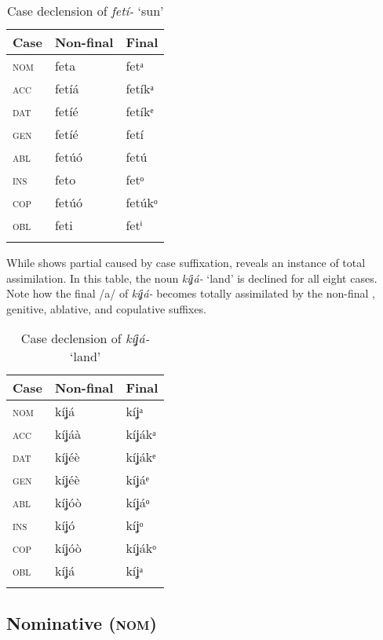 \begin{table}
\caption{Case declension of \textit{fetí-} ‘sun’}
\label{tab:case:feti}
\begin{tabularx}{.66\textwidth}{XXX}
\lsptoprule
Case & Non-final & Final\\
\midrule
\textsc{nom} & feta & fetᵃ\\
\textsc{acc} & fetíá & fetíkᵃ\\
\textsc{dat} & fetíé & fetíkᵉ\\
\textsc{gen} & fetíé & fetí\\
\textsc{abl} & fetúó & fetú\\
\textsc{ins} & feto & fetᵒ\\
\textsc{cop} & fetúó & fetúkᵒ\\
\textsc{obl} & feti & fetⁱ\\
\lspbottomrule
\end{tabularx}
\end{table}
While  shows partial  caused by case suffixation,  reveals an instance of total assimilation. In this table, the noun \textit{kíʝá-} ‘land’ is declined for all eight cases. Note how the final /a/ of \textit{kíʝá-} becomes totally assimilated by the non-final , genitive, ablative, and copulative suffixes.


\begin{table}
\caption{Case declension of \textit{kíʝá-} ‘land’}
\label{tab:case:kija}
\begin{tabularx}{.66\textwidth}{XXX}
\lsptoprule
Case & Non-final & Final\\
\midrule
\textsc{nom} & kíʝá & kíʝᵃ\\
\textsc{acc} & kíʝáà & kíʝákᵃ\\
\textsc{dat} & kíʝéè & kíʝákᵉ\\
\textsc{gen} & kíʝéè & kíʝáᵉ\\
\textsc{abl} & kíʝóò & kíʝáᵒ\\
\textsc{ins} & kíʝó & kíʝᵒ\\
\textsc{cop} & kíʝóò & kíʝákᵒ\\
\textsc{obl} & kíʝá & kíʝᵃ\\
\lspbottomrule
\end{tabularx}
\end{table}




\subsection{Nominative (\textsc{nom})}\label{sec:7.2}
\largerpage

